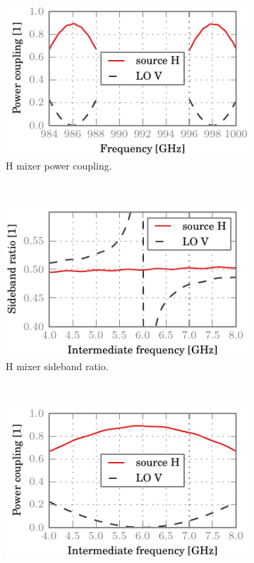 \begin{figure}[hbtp]
    \centering
    \begin{subfigure}[b]{.5\textwidth}
        \includegraphics{chapter_3/04_mh_co_h_dsb}%
        \caption{H mixer power coupling.}
    \end{subfigure}%
    \\
    \begin{subfigure}[b]{.5\textwidth}
        \includegraphics{chapter_3/04_mh_co_h_sbr}%
        \caption{H mixer sideband ratio.}
    \end{subfigure}%
    \\
    \begin{subfigure}[b]{.5\textwidth}
        \includegraphics{chapter_3/04_mh_co_h_ssb}%

\end{subfigure}
\end{figure}
